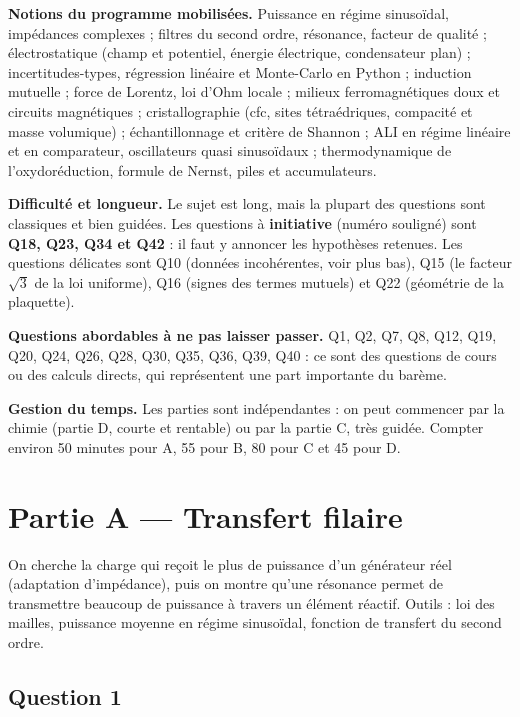 \documentclass[11pt,a4paper]{article}
\begin{document}
\textbf{Notions du programme mobilisées.} Puissance en régime sinusoïdal, impédances complexes ; filtres du second ordre, résonance, facteur de qualité ; électrostatique (champ et potentiel, énergie électrique, condensateur plan) ; incertitudes-types, régression linéaire et Monte-Carlo en Python ; induction mutuelle ; force de Lorentz, loi d'Ohm locale ; milieux ferromagnétiques doux et circuits magnétiques ; cristallographie (cfc, sites tétraédriques, compacité et masse volumique) ; échantillonnage et critère de Shannon ; ALI en régime linéaire et en comparateur, oscillateurs quasi sinusoïdaux ; thermodynamique de l'oxydoréduction, formule de Nernst, piles et accumulateurs.

\textbf{Difficulté et longueur.} Le sujet est long, mais la plupart des questions sont classiques et bien guidées. Les questions à \textbf{initiative} (numéro souligné) sont \textbf{Q18, Q23, Q34 et Q42} : il faut y annoncer les hypothèses retenues. Les questions délicates sont Q10 (données incohérentes, voir plus bas), Q15 (le facteur \(\sqrt3\) de la loi uniforme), Q16 (signes des termes mutuels) et Q22 (géométrie de la plaquette).

\textbf{Questions abordables à ne pas laisser passer.} Q1, Q2, Q7, Q8, Q12, Q19, Q20, Q24, Q26, Q28, Q30, Q35, Q36, Q39, Q40 : ce sont des questions de cours ou des calculs directs, qui représentent une part importante du barème.

\textbf{Gestion du temps.} Les parties sont indépendantes : on peut commencer par la chimie (partie D, courte et rentable) ou par la partie C, très guidée. Compter environ 50 minutes pour A, 55 pour B, 80 pour C et 45 pour D.

\hypertarget{partie-a-transfert-filaire}{%
\section{Partie A --- Transfert filaire}\label{partie-a-transfert-filaire}}

On cherche la charge qui reçoit le plus de puissance d'un générateur réel (adaptation d'impédance), puis on montre qu'une résonance permet de transmettre beaucoup de puissance à travers un élément réactif. Outils : loi des mailles, puissance moyenne en régime sinusoïdal, fonction de transfert du second ordre.

\hypertarget{question-1}{%
\subsection{Question 1}\label{question-1}}
\end{document}
